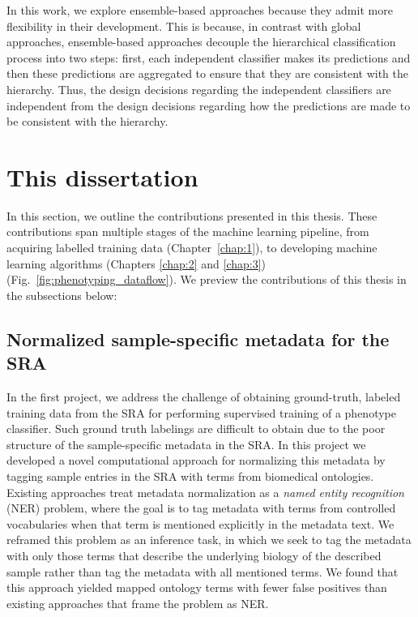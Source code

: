 In this work, we explore ensemble-based approaches because they admit more flexibility in their development. This is because, in contrast with global approaches, ensemble-based approaches decouple the hierarchical classification process into two steps: first, each independent classifier makes its predictions and then these predictions are aggregated to ensure that they are consistent with the hierarchy.  Thus, the design decisions regarding the independent classifiers are independent from the design decisions regarding how the predictions are made to be consistent with the hierarchy. 

\section{This dissertation}

In this section, we outline the contributions presented in this thesis.  These contributions span multiple stages of the machine learning pipeline, from acquiring labelled training data (Chapter~\ref{chap:1}), to developing machine learning algorithms (Chapters \ref{chap:2} and \ref{chap:3}) (Fig.~\ref{fig:phenotyping_dataflow}).  We preview the contributions of this thesis in the subsections below:
 
\subsection{Normalized sample-specific metadata for the SRA}

In the first project, we address the challenge of obtaining ground-truth, labeled training data from the SRA for performing supervised training of a phenotype classifier. Such ground truth labelings are difficult to obtain due to the poor structure of the sample-specific metadata in the SRA.  In this project we developed a novel computational approach for normalizing this metadata by tagging sample entries in the SRA with terms from biomedical ontologies. Existing approaches treat metadata normalization as a \textit{named entity recognition} (NER) problem, where the goal is to tag metadata with terms from controlled vocabularies when that term is mentioned explicitly in the metadata text. We reframed this problem as an inference task, in which we seek to tag the metadata with only those terms that describe the underlying biology of the described sample rather than tag the metadata with all mentioned terms. We found that this approach yielded mapped ontology terms with fewer false positives than existing approaches that frame the problem as NER. 

